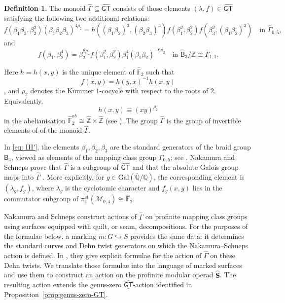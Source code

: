 \documentclass{amsart}
\newcommand{\bS}{\mathbf{S}}
\newcommand{\calM}{\mathcal{M}}
\newcommand{\galQ}{\mathbf{\mathrm{Gal}}(\overline{\mathbb{Q}}/\mathbb{Q})}
\newcommand{\GT}{\widehat{\mathsf{GT}}}
\newcommand{\NS}{\widehat{\mathsf{\Gamma}}}
\newcommand{\Br}{\mathsf{B}} %
\theoremstyle{definition}
\newtheorem{definition}[theorem]{Definition}%
\numberwithin{equation}{section}
\begin{document}
\begin{definition}\label{def: NS}
The monoid $\underline{\NS}\subseteq \underline{\GT}$ consists of those elements $(\lambda,f)\in\underline{\GT}$ satisfying the following two additional relations:
\begin{equation}\label{eq: III'}\tag{NS I}
f(\beta_1\beta_3, \beta_2^2) (\beta_1\beta_2\beta_3)^{4\rho_{2}} = h((\beta_1\beta_2)^{3}, (\beta_2\beta_3)^3) f(\beta_1^2,\beta_2^2) f(\beta_3^2,(\beta_1\beta_2)^{3})
\quad \text{in } \widehat{\Gamma}_{0,5},
\end{equation}
and
\begin{equation}\label{eq: IV}\tag{NS II}
f(\beta_1,\beta_2^{4}) = \beta_{2}^{8\rho_{2}} f(\beta_1^2,\beta_2^2) \beta^{4}_{1} (\beta_1\beta_2)^{-6\rho_2} \quad \text{in } \widehat{\Br}_3/\mathbb{Z}\cong \widehat{\Gamma}_{1,1}.
\end{equation}

Here $h=h(x,y)$ is the unique element of $\widehat{\mathbb F}_2$ such that
\[
f(x,y)=h(y,x)^{-1}h(x,y)
\]
\cite{lochak1997cohomological}, and $\rho_2$ denotes the Kummer $1$-cocycle with respect to the roots of $2$. Equivalently,
\[
h(x,y)\equiv (xy)^{\rho_2}
\]
in the abelianisation $\widehat{\mathbb F}_2^{ab}\cong \widehat{\mathbb Z}\times\widehat{\mathbb Z}$ (see \cite[Definition~5.1]{Nakamura-Schneps}). The group $\NS$ is the group of invertible elements of of the monoid $\underline{\NS}$.
\end{definition}

In \eqref{eq: III'}, the elements $\beta_1,\beta_2,\beta_3$ are the standard generators of the braid group $\Br_4$, viewed as elements of the mapping class group $\Gamma_{0,5}$; see \cite[Proposition~5.4]{Nakamura-Schneps}. Nakamura and Schneps prove that $\NS$ is a subgroup of $\GT$ and that the absolute Galois group maps into $\NS$ \cite[Theorem~1.2]{Nakamura-Schneps}. More explicitly, for $g\in\galQ$, the corresponding element is $(\lambda_g,f_g)$, where $\lambda_g$ is the cyclotomic character and $f_g(x,y)$ lies in the commutator subgroup of $\pi_1^{\mathrm{et}}(\calM_{0,4})\cong\widehat{\mathbb F}_2$.

Nakamura and Schneps construct actions of $\NS$ on profinite mapping class groups using surfaces equipped with quilt, or seam, decompositions. For the purposes of the formulae below, a marking $m:G\hookrightarrow S$ provides the same data: it determines the standard curves and Dehn twist generators on which the Nakamura--Schneps action is defined. In \cite[Theorem~11.2]{Nakamura-Schneps}, they give explicit formulae for the action of $\NS$ on these Dehn twists. We translate those formulae into the language of marked surfaces and use them to construct an action on the profinite modular operad $\widehat{\bS}$. The resulting action extends the genus-zero $\underline{\GT}$-action identified in 
Proposition~\ref{prop:genus-zero-GT}.
\end{document}
